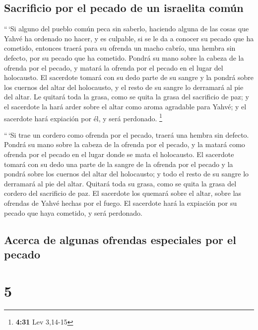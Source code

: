 \hypertarget{sacrificio-por-el-pecado-de-un-israelita-comuxfan}{%
\subsection{Sacrificio por el pecado de un israelita
común}\label{sacrificio-por-el-pecado-de-un-israelita-comuxfan}}

 ``\,`Si alguno del pueblo común peca sin saberlo,
haciendo alguna de las cosas que Yahvé ha ordenado no hacer, y es
culpable,  si se le da a conocer su pecado que ha
cometido, entonces traerá para su ofrenda un macho cabrío, una hembra
sin defecto, por su pecado que ha cometido.  Pondrá su
mano sobre la cabeza de la ofrenda por el pecado, y matará la ofrenda
por el pecado en el lugar del holocausto.  El sacerdote
tomará con su dedo parte de su sangre y la pondrá sobre los cuernos del
altar del holocausto, y el resto de su sangre lo derramará al pie del
altar.  Le quitará toda la grasa, como se quita la grasa
del sacrificio de paz; y el sacerdote la hará arder sobre el altar como
aroma agradable para Yahvé; y el sacerdote hará expiación por él, y será
perdonado. \footnote{\textbf{4:31} Lev 3,14-15}

 ``\,`Si trae un cordero como ofrenda por el pecado,
traerá una hembra sin defecto.  Pondrá su mano sobre la
cabeza de la ofrenda por el pecado, y la matará como ofrenda por el
pecado en el lugar donde se mata el holocausto.  El
sacerdote tomará con su dedo una parte de la sangre de la ofrenda por el
pecado y la pondrá sobre los cuernos del altar del holocausto; y todo el
resto de su sangre lo derramará al pie del altar. 
Quitará toda su grasa, como se quita la grasa del cordero del sacrificio
de paz. El sacerdote los quemará sobre el altar, sobre las ofrendas de
Yahvé hechas por el fuego. El sacerdote hará la expiación por su pecado
que haya cometido, y será perdonado.

\hypertarget{acerca-de-algunas-ofrendas-especiales-por-el-pecado}{%
\subsection{Acerca de algunas ofrendas especiales por el
pecado}\label{acerca-de-algunas-ofrendas-especiales-por-el-pecado}}

\hypertarget{section-4}{%
\section{5}\label{section-4}}

